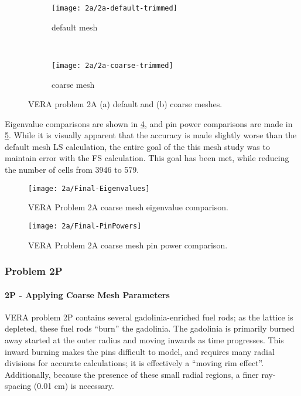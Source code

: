 {{{{{          \begin{figure}[h]
              \centering
              \begin{subfigure}[t]{0.45\textwidth}
                  \centering
                  \texttt{[image: 2a/2a-default-trimmed]}
                  \caption{default mesh\label{fig:LSMOC:2a:Default Mesh}}
              \end{subfigure}%
              ~
              \begin{subfigure}[t]{0.45\textwidth}
                  \centering
                  \texttt{[image: 2a/2a-coarse-trimmed]}
                  \caption{coarse mesh\label{fig:LSMOC:2a:Coarse Mesh}}
              \end{subfigure}
              \caption{VERA problem 2A (a) default and (b) coarse meshes.\label{figs:LSMOC:2a:Meshes}}
          \end{figure}

          Eigenvalue comparisons are shown in \cref{fig:LSMOC:2A:Coarse Mesh:Eigenvalues}, and pin power comparisons are made in \cref{fig:LSMOC:2A:Coarse Mesh:PinPowers}.
          While it is visually apparent that the accuracy is made slightly worse than the default mesh \ac{LS} calculation, the entire goal of the this mesh study was to maintain error with the \ac{FS} calculation.
          This goal has been met, while reducing the number of cells from 3946 to 579.

          \begin{figure}
            \centering
            \texttt{[image: 2a/Final-Eigenvalues]}
            \caption{VERA Problem 2A coarse mesh eigenvalue comparison. \label{fig:LSMOC:2A:Coarse Mesh:Eigenvalues}}
          \end{figure}
          \begin{figure}
            \centering
            \texttt{[image: 2a/Final-PinPowers]}
            \caption{VERA Problem 2A coarse mesh pin power comparison. \label{fig:LSMOC:2A:Coarse Mesh:PinPowers}}
          \end{figure}
        }
      }

      \subsubsection{Problem 2P}{\label{sssec:LSMOC:Problem 2P}
        \paragraph{2P - Applying Coarse Mesh Parameters}{
          \ac{VERA} problem 2P contains several gadolinia-enriched fuel rods; as the lattice is depleted, these fuel rods ``burn'' the gadolinia.
          The gadolinia is primarily burned away started at the outer radius and moving inwards as time progresses.
          This inward burning makes the pins difficult to model, and requires many radial divisions for accurate calculations; it is effectively a ``moving rim effect''.
          Additionally, because the presence of these small radial regions, a finer ray-spacing (0.01 cm) is necessary.

}}}}}
